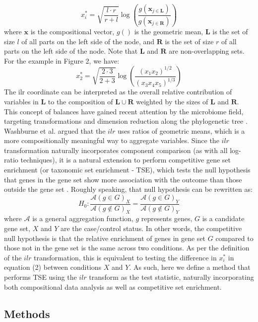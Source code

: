 \documentclass{article}
\begin{document}
\begin{equation}
    x_i^* = \sqrt{\frac{l \cdot r}{r + l}} \log \left(\frac{g(\bm{x}_{j \in \bm{L}})}{g(\bm{x}_{j \in \bm{R}})}\right)
\end{equation}
where $\bm{x}$ is the compositional vector, $g()$ is the geometric mean, $\bm{L}$ is the set of size $l$ of all parts on the left side of the node, and $\bm R$ is the set of size $r$ of all parts on the left side of the node. Note that $\bm L$ and $\bm R$ are non-overlapping sets. For the example in Figure 2, we have: 
\[ x_2^* = \sqrt{\frac{2 \cdot 3}{2 + 3}} \log \left( \frac{(x_1x_2)^{1/2}}{(x_3x_4x_5)^{1/3}}\right) \]
The ilr coordinate can be interpreted as the overall relative contribution of variables in $\bm L$ to the composition of $\bm L \cup \bm R$ weighted by the sizes of $\bm L$ and $\bm R$. This concept of balances have gained recent attention by the microbiome field, targeting transformations and dimension reduction along the phylogenetic tree \cite{washburne2017a, silverman2017a}. Washburne et al. \cite{washburne2017a} argued that the $ilr$ uses ratios of geometric means, which is a more compositionally meaningful way to aggregate variables. Since the $ilr$ transformation naturally incorporates component comparison (as with all log-ratio techniques), it is a natural extension to perform competitive gene set enrichment (or taxonomic set enrichment - TSE), which tests the null hypothesis that genes in the gene set show more association with the outcome than those outside the gene set \cite{tian2005}. Roughly speaking, that null hypothesis can be rewritten as:
\begin{equation}
H_0 : \frac{\mathcal{A}(g \in G)_X}{\mathcal{A}(g \notin G)_X} = \frac{\mathcal{A}(g \in G)_Y}{\mathcal{A}(g \notin G)_Y}
\end{equation}
where $\mathcal{A}$ is a general aggregation function, $g$ represents genes, $G$ is a candidate gene set, $X$ and $Y$ are the case/control status. In other words, the competitive null hypothesis is that the relative enrichment of genes in gene set $G$ compared to those not in the gene set is the same across two conditions. As per the definition of the $ilr$ transformation, this is equivalent to testing the difference in $x^*_i$ in equation (2) between conditions $X$ and $Y$. As such, here we define a method that performs TSE using the $ilr$ transform as the test statistic, naturally incorporating both compositional data analysis as well as competitive set enrichment.     

\subsection{Methods}
\end{document}
